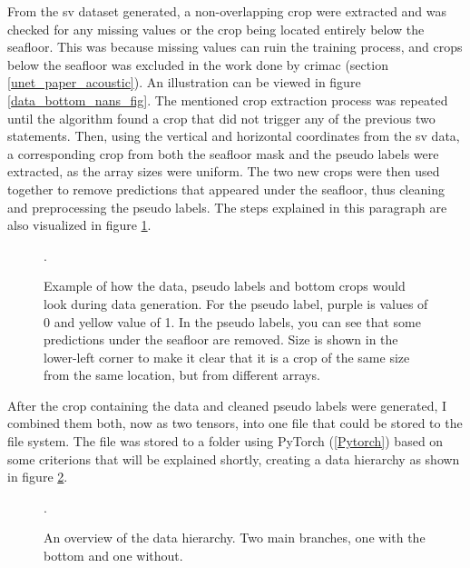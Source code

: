         
        From the \gls{sv} dataset generated, a non-overlapping crop were extracted and was checked for any missing values or the crop being located entirely below the seafloor. This was because missing values can ruin the training process, and crops below the seafloor was excluded in the work done by \gls{crimac} (section \ref{unet_paper_acoustic}). An illustration can be viewed in figure \ref{data_bottom_nans_fig}. The mentioned crop extraction process was repeated until the algorithm found a crop that did not trigger any of the previous two statements. Then, using the vertical and horizontal coordinates from the \gls{sv} data, a corresponding crop from both the seafloor mask and the pseudo labels were extracted, as the array sizes were uniform. The two new crops were then used together to remove predictions that appeared under the seafloor, thus cleaning and preprocessing the pseudo labels. The steps explained in this paragraph are also visualized in figure \ref{crop_extract_fig}. 
        \clearpage
        \begin{figure}[H]
            \centering
            
            \caption[Data, label and bottom crop extraction and interaction]{Example of how the data, pseudo labels and bottom crops would look during data generation. For the pseudo label, purple is values of 0 and yellow value of 1. In the pseudo labels, you can see that some predictions under the seafloor are removed.  Size is shown in the lower-left corner to make it clear that it is a crop of the same size from the same location, but from different arrays.}.
          	\medskip 
            \label{crop_extract_fig}
        \end{figure}
        
        After the crop containing the data and cleaned pseudo labels were generated, I combined them both, now as two tensors, into one file that could be stored to the file system. The file was stored to a folder using PyTorch (\ref{Pytorch}) based on some criterions that will be explained shortly, creating a data hierarchy as shown in figure \ref{data_hierarchy_fig}.
        
        
        \begin{figure}[H]
            \centering
            
            \caption[The data-hierarchy]{An overview of the data hierarchy. Two main branches, one with the bottom and one without.}.
          	\medskip 
            \label{data_hierarchy_fig}
        \end{figure}
        
